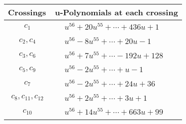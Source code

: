 \documentclass[1p]{elsarticle_modified}
\theoremstyle{definition}
\begin{document}
\begin{tabular}{m{50pt}|m{274pt}}
Crossings & \hspace{64pt}u-Polynomials at each crossing \\
\hline $$\begin{aligned}c_{1}\end{aligned}$$&$\begin{aligned}
&u^{56}+20 u^{55}+\cdots+436 u+1
\end{aligned}$\\
\hline $$\begin{aligned}c_{2},c_{4}\end{aligned}$$&$\begin{aligned}
&u^{56}-8 u^{55}+\cdots+20 u-1
\end{aligned}$\\
\hline $$\begin{aligned}c_{3},c_{6}\end{aligned}$$&$\begin{aligned}
&u^{56}+7 u^{55}+\cdots-192 u+128
\end{aligned}$\\
\hline $$\begin{aligned}c_{5},c_{9}\end{aligned}$$&$\begin{aligned}
&u^{56}-2 u^{55}+\cdots+u-1
\end{aligned}$\\
\hline $$\begin{aligned}c_{7}\end{aligned}$$&$\begin{aligned}
&u^{56}-2 u^{55}+\cdots+24 u+36
\end{aligned}$\\
\hline $$\begin{aligned}c_{8},c_{11},c_{12}\end{aligned}$$&$\begin{aligned}
&u^{56}+2 u^{55}+\cdots+3 u+1
\end{aligned}$\\
\hline $$\begin{aligned}c_{10}\end{aligned}$$&$\begin{aligned}
&u^{56}+14 u^{55}+\cdots+663 u+99
\end{aligned}$\\
\hline
\end{tabular}\\~\\
\newpage\renewcommand{\arraystretch}{1}
\end{document}
